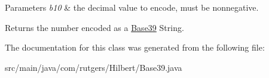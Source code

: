 \begin{DoxyParams}{Parameters}
{\em b10} & the decimal value to encode, must be nonnegative. \\
\hline
\end{DoxyParams}
\begin{DoxyReturn}{Returns}
the number encoded as a \hyperlink{classcom_1_1rutgers_1_1Hilbert_1_1Base39}{Base39} {\ttfamily String}. 
\end{DoxyReturn}


The documentation for this class was generated from the following file\+:\begin{DoxyCompactItemize}
\item 
src/main/java/com/rutgers/\+Hilbert/Base39.\+java\end{DoxyCompactItemize}
